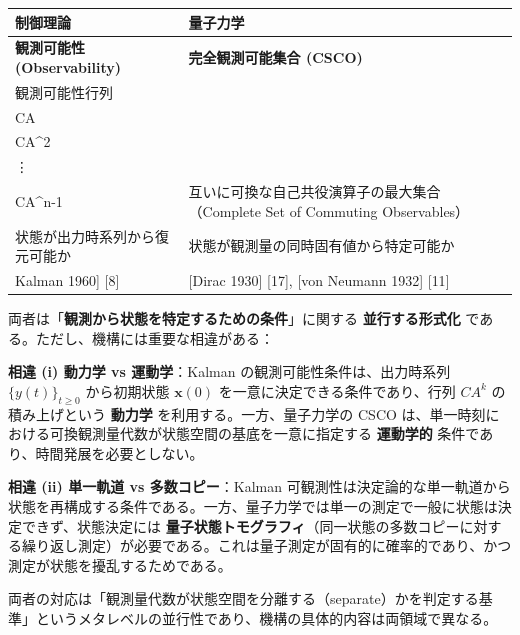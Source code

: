 \documentclass[
]{ltjsarticle}
\newcounter{none} %
\begin{document}
{\def\LTcaptype{none} %
\begin{longtable}[]{@{}
  >{\raggedright\arraybackslash}p{}
  >{\raggedright\arraybackslash}p{}@{}}
\toprule\noalign{}
\begin{minipage}[b]{\linewidth}\raggedright
制御理論
\end{minipage} & \begin{minipage}[b]{\linewidth}\raggedright
量子力学
\end{minipage} \\
\midrule\noalign{}
\endhead
\bottomrule\noalign{}
\endlastfoot
\textbf{観測可能性 (Observability)} & \textbf{完全観測可能集合
(CSCO)} \\
観測可能性行列
\(\mathcal{O} = \begin{pmatrix}C\\CA\\CA^2\\\vdots\\CA^{n-1}\end{pmatrix}\)
のランク条件 & 互いに可換な自己共役演算子の最大集合（Complete Set of
Commuting Observables） \\
状態が出力時系列から復元可能か &
状態が観測量の同時固有値から特定可能か \\
{[}Kalman 1960{]} {[}8{]} & {[}Dirac 1930{]} {[}17{]}, {[}von Neumann
1932{]} {[}11{]} \\
\end{longtable}
}

両者は「\textbf{観測から状態を特定するための条件}」に関する
\textbf{並行する形式化} である。ただし、機構には重要な相違がある：

\textbf{相違 (i) 動力学 vs 運動学}：Kalman
の観測可能性条件は、出力時系列 \(\{y(t)\}_{t \geq 0}\) から初期状態
\(\mathbf{x}(0)\) を一意に決定できる条件であり、行列 \(CA^k\)
の積み上げという \textbf{動力学} を利用する。一方、量子力学の CSCO
は、単一時刻における可換観測量代数が状態空間の基底を一意に指定する
\textbf{運動学的} 条件であり、時間発展を必要としない。

\textbf{相違 (ii) 単一軌道 vs 多数コピー}：Kalman
可観測性は決定論的な単一軌道から状態を再構成する条件である。一方、量子力学では単一の測定で一般に状態は決定できず、状態決定には
\textbf{量子状態トモグラフィ}（同一状態の多数コピーに対する繰り返し測定）が必要である。これは量子測定が固有的に確率的であり、かつ測定が状態を擾乱するためである。

両者の対応は「観測量代数が状態空間を分離する（separate）かを判定する基準」というメタレベルの並行性であり、機構の具体的内容は両領域で異なる。
\end{document}
